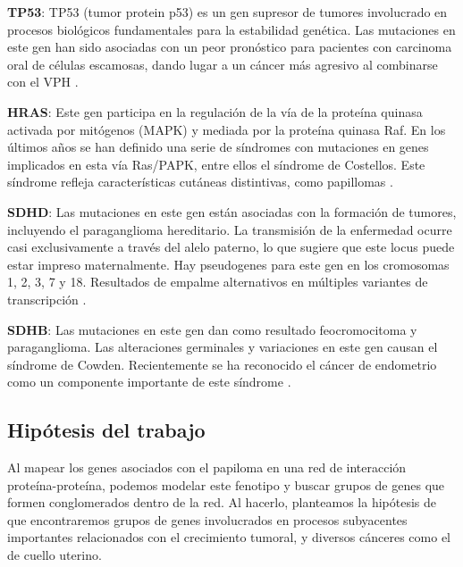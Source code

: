 \textbf{TP53}: TP53 (tumor protein p53) es un gen supresor de tumores involucrado en procesos biológicos fundamentales para la estabilidad genética. Las mutaciones en este gen han sido asociadas con un peor pronóstico para pacientes con carcinoma oral de células escamosas, dando lugar a un cáncer más agresivo al combinarse con el VPH \cite{McKenna2021}.

\textbf{HRAS}: Este gen participa en la regulación de la vía de la proteína quinasa activada por mitógenos (MAPK) y mediada por la proteína quinasa Raf. En los últimos años se han definido una serie de síndromes con mutaciones en genes implicados en esta vía Ras/PAPK, entre ellos el síndrome de Costellos. Este síndrome refleja características cutáneas distintivas, como papillomas \cite{Siegel2012}.

\textbf{SDHD}: Las mutaciones en este gen están asociadas con la formación de tumores, incluyendo el paraganglioma hereditario. La transmisión de la enfermedad ocurre casi exclusivamente a través del alelo paterno, lo que sugiere que este locus puede estar impreso maternalmente. Hay pseudogenes para este gen en los cromosomas 1, 2, 3, 7 y 18. Resultados de empalme alternativos en múltiples variantes de transcripción \cite{Hensen2004}.

\textbf{SDHB}: Las mutaciones en este gen dan como resultado feocromocitoma y paraganglioma. Las alteraciones germinales y variaciones en este gen causan el síndrome de Cowden. Recientemente se ha reconocido el cáncer de endometrio como un componente importante de este síndrome \cite{Mahdi2015}.

\vspace{5pt}

\subsection{Hipótesis del trabajo}
Al mapear los genes asociados con el papiloma en una red de interacción proteína-proteína, podemos modelar este fenotipo y buscar grupos de genes que formen conglomerados dentro de la red. Al hacerlo, planteamos la hipótesis de que encontraremos grupos de genes involucrados en procesos subyacentes importantes relacionados con el crecimiento tumoral, y diversos cánceres como el de cuello uterino.

